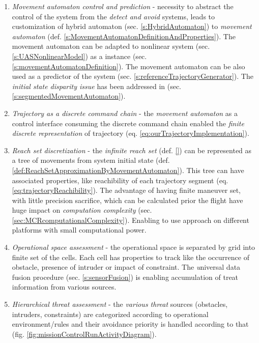 \begin{enumerate}
    \item \emph{Movement automaton control and prediction} -  necessity to abstract the control of the system from the \emph{detect and avoid} systems, leads to customization of hybrid automaton (sec. \ref{s:HybridAutomaton}) to \emph{movement automaton} (def. \ref{s:MovementAutomatonDefinitionAndProperties}). The movement automaton can be adapted to nonlinear system (sec. \ref{s:UASNonlinearModel}) as a instance (sec. \ref{s:movementAutomatonDefinition}). The movement automaton can be also used as a predictor of the system (sec. \ref{s:referenceTrajectoryGenerator}). The \emph{initial state disparity issue} \cite{gomola2017obstacle} has been addressed in (sec. \ref{s:segmentedMovementAutomaton}).
    
    \item \emph{Trajectory as a discrete command chain} -  the \emph{movement automaton} as a control interface consuming the discrete command chain enabled the \emph{finite discrete representation} of trajectory (eq. \ref{eq:ourTrajectoryImplementation}).
    
    \item \emph{Reach set discretization} - the \emph{infinite reach set} (def. \ref{}) can be represented as a tree of movements from system initial state (def. \ref{def:ReachSetApproximationByMovementAutomaton}). This tree can have associated properties, like reachibility of each trajectory segment (eq. \ref{eq:trajectoryReachibility}).  The advantage of having finite maneuver set, with little precision sacrifice, which can be calculated prior the flight have huge impact on \emph{computation complexity} (sec. \ref{sec:MCRcomputationalComplexity}). Enabling to use approach on different platforms with small computational power. 
    
    \item \emph{Operational space assessment} - the operational space is separated by grid into finite set of the cells. Each cell has properties to track like the occurrence of obstacle, presence of intruder or impact of constraint. The \emph universal data fusion procedure (sec. \ref{s:sensorFusion}) is enabling accumulation of treat information from various sources.
    
    \item \emph{Hierarchical threat assessment} -  the \emph{various threat} sources (obstacles, intruders, constraints) are categorized according to operational environment/rules and their avoidance priority is handled according to that (fig. \ref{fig:missionControlRunActivityDiagram}).
    

\end{enumerate}
